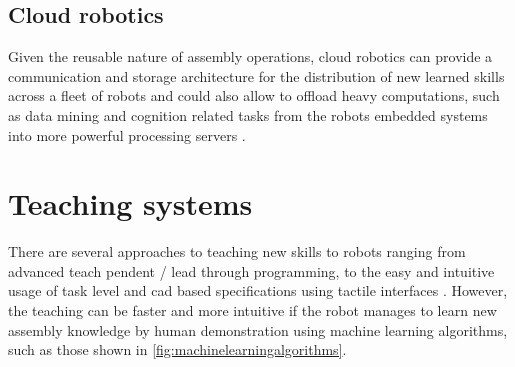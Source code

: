 \subsection{Cloud robotics}

Given the reusable nature of assembly operations, cloud robotics can provide a communication and storage architecture for the distribution of new learned skills across a fleet of robots \cite{Tenorth2013} and could also allow to offload heavy computations, such as data mining \cite{Witten2005} and cognition related tasks \cite{Beetz2010,Tenorth2013k,Saxena2014,Beetz2015} from the robots embedded systems into more powerful processing servers \cite{Hunziker2013}.




\section{Teaching systems}

There are several approaches to teaching new skills to robots ranging from advanced teach pendent / lead through programming, to the easy and intuitive usage of task level and \gls{cad} based specifications using tactile interfaces \cite{Perzylo2015a}. However, the teaching can be faster and more intuitive if the robot manages to learn new assembly knowledge \cite{tensorflow} by human demonstration \cite{Argall2009,Hamabe2015,Wang2015} using machine learning algorithms, such as those shown in \cref{fig:machinelearningalgorithms}.

